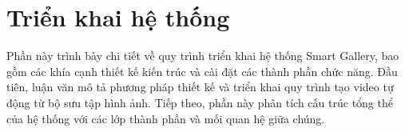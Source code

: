 \section{Triển khai hệ thống}

Phần này trình bày chi tiết về quy trình triển khai hệ thống Smart Gallery, bao gồm các khía cạnh thiết kế kiến trúc và cài đặt các thành phần chức năng. Đầu tiên, luận văn mô tả phương pháp thiết kế và triển khai quy trình tạo video tự động từ bộ sưu tập hình ảnh. Tiếp theo, phần này phân tích cấu trúc tổng thể của hệ thống với các lớp thành phần và mối quan hệ giữa chúng.



